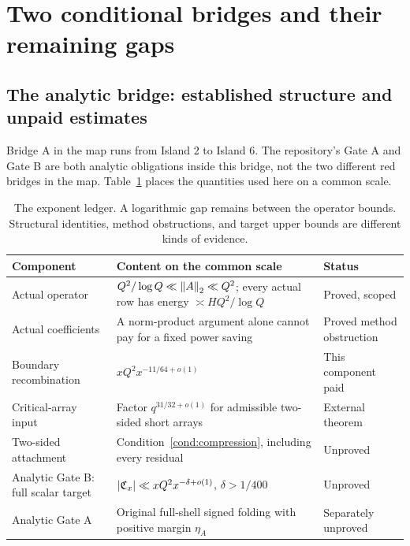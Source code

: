 \section{Two conditional bridges and their remaining gaps}\label{sec:bridges}
\subsection{The analytic bridge: established structure and unpaid estimates}
Bridge A in the map runs from Island 2 to Island 6. The repository's Gate A and Gate B are both analytic obligations inside this bridge, not the two different red bridges in the map.
Table~\ref{tab:ledger} places the quantities used here on a common scale.
\begin{table}[htbp]
\centering\small
\begin{tabularx}{\linewidth}{@{}>{\raggedright\arraybackslash}p{.19\linewidth}X>{\raggedright\arraybackslash}p{.19\linewidth}@{}}
\toprule
Component & Content on the common scale & Status\\\midrule
Actual operator & $Q^2/\log Q\ll\left\|A\right\|_2\ll Q^2$; every actual row has energy $\asymp HQ^2/\log Q$ & Proved, scoped\\
Actual coefficients & A norm-product argument alone cannot pay for a fixed power saving & Proved method obstruction\\
Boundary recombination & $xQ^2x^{-11/64+o(1)}$ & This component paid\\
Critical-array input & Factor $q^{31/32+o(1)}$ for admissible two-sided short arrays & External theorem\\
Two-sided attachment & Condition~\ref{cond:compression}, including every residual & Unproved\\
Analytic Gate B: full scalar target & $|\mathfrak C_x|\ll xQ^2x^{-\delta+o(1)}$, $\delta>1/400$ & Unproved\\
Analytic Gate A & Original full-shell signed folding with positive margin $\eta_A$ & Separately unproved\\
\bottomrule
\end{tabularx}
\caption{The exponent ledger. A logarithmic gap remains between the operator bounds. Structural identities, method obstructions, and target upper bounds are different kinds of evidence.}\label{tab:ledger}
\end{table}
